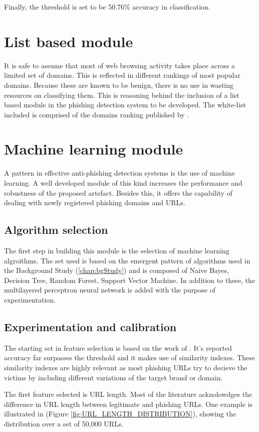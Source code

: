 Finally, the threshold is set to be 50.76\% accuracy in classification.

\section{List based module}

It is safe to assume that most of web browsing activity takes place across a limited set of domains. This is reflected in different rankings of most popular domains. Because these are known to be benign, there is no use in wasting resources on classifying them. This is reasoning behind the inclusion of a list based module in the phishing detection system to be developed.
The white-list included is comprised of the domains ranking published by \cite{MAJESTIC_MILLION}.

\section{Machine learning module}
A pattern in effective anti-phishing detection systems is the use of machine learning. A well developed module of this kind increases the performance and robustness of the proposed artefact. Besides this, it offers the capability of dealing with newly registered phishing domains and URLs.

\subsection{Algorithm selection}
The first step in building this module is the selection of machine learning algroithms. The set used is based on the emergent pattern of algorithms used in the Background Study (\ref{chap:bgStudy}) and is composed of Naive Bayes, Decision Tree, Random Forest, Support Vector Machine. In addition to these, the multilayered perceptron neural network is added with the purpose of experimentation.

\subsection{Experimentation and calibration}
The starting set in feature selection is based on the work of \cite{SVM_SIMILARITY_INDEX}. It's reported accuracy far surpasses the threshold and it makes use of similarity indexes. These similarity indexes are highly relevant as most phishing URLs try to decieve the victims by including different variations of the target brand or domain.

The first feature selected is URL length. Most of the literature acknolowdges the difference in URL length between legitimate and phishing URLs. One example is illustrated in \cite{STACKED_ML_URL_HTML} (Figure \ref{fig:URL_LENGTH_DISTRIBUTION}), showing the distribution over a set of 50,000 URLs.

